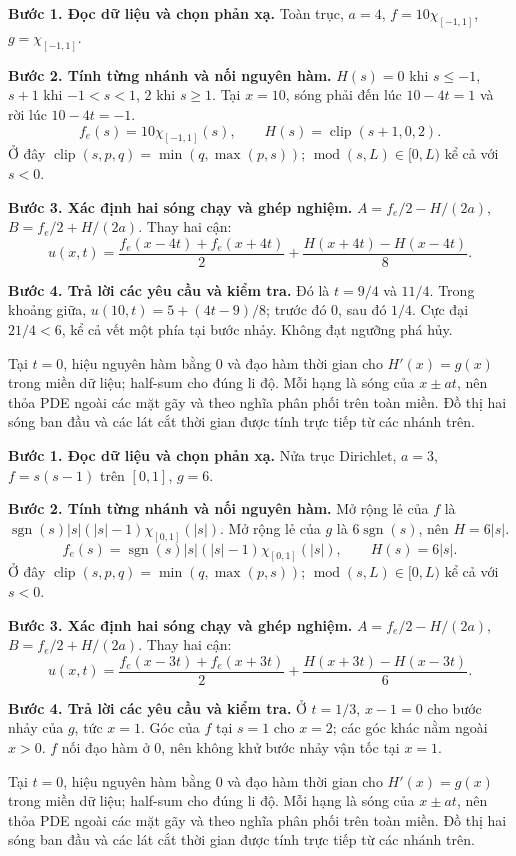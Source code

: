 \textbf{Bước 1. Đọc dữ liệu và chọn phản xạ.} Toàn trục, $a=4$, $f=10\chi_{[-1,1]}$, $g=\chi_{[-1,1]}$.

\textbf{Bước 2. Tính từng nhánh và nối nguyên hàm.} $H(s)=0$ khi $s\le-1$, $s+1$ khi $-1<s<1$, $2$ khi $s\ge1$. Tại $x=10$, sóng phải đến lúc $10-4t=1$ và rời lúc $10-4t=-1$.
\[f_e(s)=10\chi_{[-1,1]}(s),\qquad H(s)=\operatorname{clip}(s+1,0,2).\]
Ở đây $\operatorname{clip}(s,p,q)=\min(q,\max(p,s))$; $\operatorname{mod}(s,L)\in[0,L)$ kể cả với $s<0$.

\textbf{Bước 3. Xác định hai sóng chạy và ghép nghiệm.} $A=f_e/2-H/(2a)$, $B=f_e/2+H/(2a)$. Thay hai cận:
\[u(x,t)=\frac{f_e(x-4t)+f_e(x+4t)}2+\frac{H(x+4t)-H(x-4t)}{8}.\]

\textbf{Bước 4. Trả lời các yêu cầu và kiểm tra.} Đó là $t=9/4$ và $11/4$. Trong khoảng giữa, $u(10,t)=5+(4t-9)/8$; trước đó $0$, sau đó $1/4$. Cực đại $21/4<6$, kể cả vết một phía tại bước nhảy. Không đạt ngưỡng phá hủy.

Tại $t=0$, hiệu nguyên hàm bằng $0$ và đạo hàm thời gian cho $H'(x)=g(x)$ trong miền dữ liệu; half-sum cho đúng li độ. Mỗi hạng là sóng của $x\pm at$, nên thỏa PDE ngoài các mặt gãy và theo nghĩa phân phối trên toàn miền. Đồ thị hai sóng ban đầu và các lát cắt thời gian được tính trực tiếp từ các nhánh trên.

\textbf{Bước 1. Đọc dữ liệu và chọn phản xạ.} Nửa trục Dirichlet, $a=3$, $f=s(s-1)$ trên $[0,1]$, $g=6$.

\textbf{Bước 2. Tính từng nhánh và nối nguyên hàm.} Mở rộng lẻ của $f$ là $\operatorname{sgn}(s)|s|(|s|-1)\chi_{[0,1]}(|s|)$. Mở rộng lẻ của $g$ là $6\operatorname{sgn}(s)$, nên $H=6|s|$.
\[f_e(s)=\operatorname{sgn}(s)|s|(|s|-1)\chi_{[0,1]}(|s|),\qquad H(s)=6|s|.\]
Ở đây $\operatorname{clip}(s,p,q)=\min(q,\max(p,s))$; $\operatorname{mod}(s,L)\in[0,L)$ kể cả với $s<0$.

\textbf{Bước 3. Xác định hai sóng chạy và ghép nghiệm.} $A=f_e/2-H/(2a)$, $B=f_e/2+H/(2a)$. Thay hai cận:
\[u(x,t)=\frac{f_e(x-3t)+f_e(x+3t)}2+\frac{H(x+3t)-H(x-3t)}{6}.\]

\textbf{Bước 4. Trả lời các yêu cầu và kiểm tra.} Ở $t=1/3$, $x-1=0$ cho bước nhảy của $g$, tức $x=1$. Góc của $f$ tại $s=1$ cho $x=2$; các góc khác nằm ngoài $x>0$. $f$ nối đạo hàm ở $0$, nên không khử bước nhảy vận tốc tại $x=1$.

Tại $t=0$, hiệu nguyên hàm bằng $0$ và đạo hàm thời gian cho $H'(x)=g(x)$ trong miền dữ liệu; half-sum cho đúng li độ. Mỗi hạng là sóng của $x\pm at$, nên thỏa PDE ngoài các mặt gãy và theo nghĩa phân phối trên toàn miền. Đồ thị hai sóng ban đầu và các lát cắt thời gian được tính trực tiếp từ các nhánh trên.

